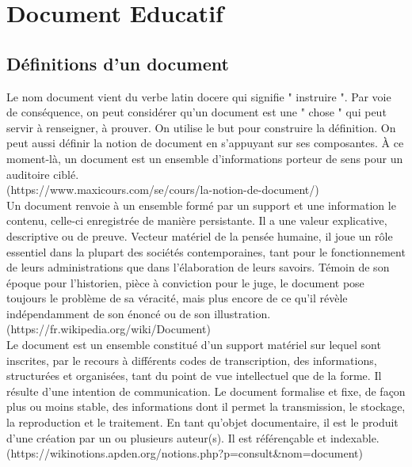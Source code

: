 \documentclass[12pt]{report}
\begin{document}
\section{Document Educatif}

\subsection{Définitions d'un document}

Le nom document vient du verbe latin docere qui signifie " instruire ". Par voie de conséquence, on peut considérer qu’un document est une " chose " qui peut servir à renseigner, à prouver. On utilise le but pour construire la définition.
On peut aussi définir la notion de document en s’appuyant sur ses composantes. À ce moment-là, un document est un ensemble d’informations porteur de sens pour un auditoire ciblé.\\
(https://www.maxicours.com/se/cours/la-notion-de-document/)\\

Un document renvoie à un ensemble formé par un support et une information le contenu, celle-ci enregistrée de manière persistante. Il a une valeur explicative, descriptive ou de preuve. Vecteur matériel de la pensée humaine, il joue un rôle essentiel dans la plupart des sociétés contemporaines, tant pour le fonctionnement de leurs administrations que dans l'élaboration de leurs savoirs. Témoin de son époque pour l'historien, pièce à conviction pour le juge, le document pose toujours le problème de sa véracité, mais plus encore de ce qu'il révèle indépendamment de son énoncé ou de son illustration.
\\(https://fr.wikipedia.org/wiki/Document)\\

Le document est un ensemble constitué d'un support matériel sur lequel sont inscrites, par le recours à  différents codes de transcription, des informations, structurées et organisées, tant du point de vue intellectuel que de la forme. Il résulte d'une intention de communication. Le document formalise et fixe, de façon plus ou moins stable, des informations dont il permet la transmission, le stockage, la reproduction et le traitement. En tant qu'objet documentaire, il est le produit d'une création par un ou plusieurs auteur(s). Il est référençable et indexable. 
\\(https://wikinotions.apden.org/notions.php?p=consult\&nom=document)\\
\end{document}
